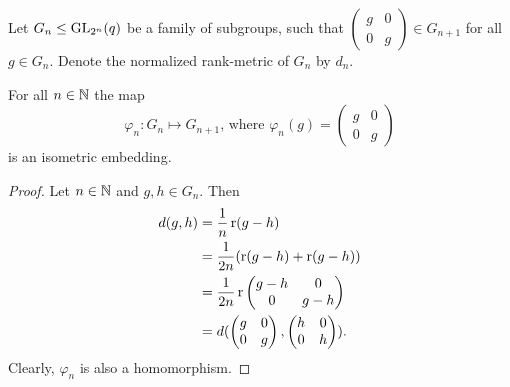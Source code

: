 Let $G_n\leq \operatorname{GL}_{2^n}(q)$ be a family of subgroups, such that 
$\begin{pmatrix}
g &0\\
0&g
\end{pmatrix}\in G_{n+1}$ for all $g\in G_n$. Denote the normalized rank-metric of $G_n$ by $d_n$.
\begin{lemma}
For all $n\in \mathbb{N}$ the map
\[\varphi_n\colon G_n\mapsto G_{n+1}\text{, where }\varphi_n(g)=\begin{pmatrix}
g &0\\
0&g
\end{pmatrix}\]
is an isometric embedding. 
\end{lemma}
\begin{proof}
Let $n\in\mathbb{N}$ and $g,h\in G_n$. Then
\begin{align*}
d(g,h)&=\frac{1}{n}\operatorname{r}(g-h)\\
&=\frac{1}{2n}(\operatorname{r}(g-h)+\operatorname{r}(g-h))\\
&=\frac{1}{2n}\operatorname{r}
\begin{pmatrix}
g-h &0\\
0&g-h
\end{pmatrix}\\
&=d(
\begin{pmatrix}
g &0\\
0&g
\end{pmatrix},
\begin{pmatrix}
h &0\\
0&h
\end{pmatrix}).
\end{align*}
Clearly, $\varphi_n$ is also a homomorphism.
\end{proof}

